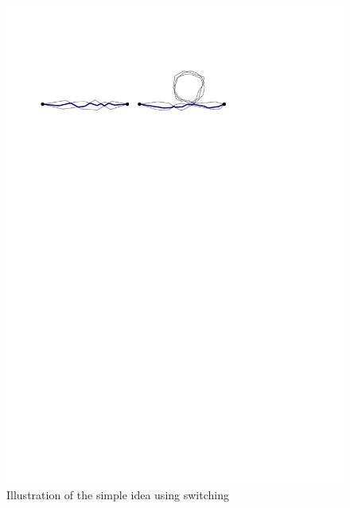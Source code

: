 \begin{figure}
\centering
\includegraphics[scale=1]{Gambar/switch_fail0}
\caption[Illustration of the simple idea using switching]{Illustration of the simple idea using switching} 
\label{fig:switch_fail0}
\end{figure}

